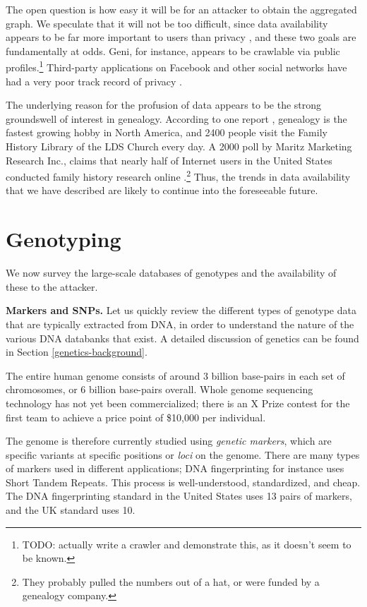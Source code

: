 \documentclass{article}
\begin{document}
The open question is how easy it will be for an attacker to obtain the aggregated graph. We speculate that it will not be too difficult, since data availability appears to be far more important to users than privacy \cite{wp-geni.com}, and these two goals are fundamentally at odds. Geni, for instance, appears to be crawlable via public profiles.\footnote{TODO: actually write a crawler and demonstrate this, as it doesn't seem to be known.}  Third-party applications on Facebook and other social networks have had a very poor track record of privacy \cite{felt-evans}.

The underlying reason for the profusion of data appears to be the strong groundswell of interest in genealogy. According to one report \cite{hobby}, genealogy is the fastest growing hobby in North America, and 2400 people visit the Family History Library of the LDS Church every day. A 2000 poll by Maritz Marketing Research Inc., claims that nearly half of Internet users in the United States conducted family history research online \cite{maritz-poll}.\footnote{They probably pulled the numbers out of a hat, or were funded by a genealogy company.} Thus, the trends in data availability that we have described are likely to continue into the foreseeable future.


\section{Genotyping}
\label{genotype-survey}
We now survey the large-scale databases of genotypes and the availability of these to the attacker. 

{\bf Markers and SNPs.} 
Let us quickly review the different types of genotype data that are typically extracted from DNA, in order to understand the nature of the various DNA databanks that exist. A detailed discussion of genetics can be found in Section \ref{genetics-background}.

The entire human genome consists of around 3 billion base-pairs in each set of chromosomes, or 6 billion base-pairs overall. Whole genome sequencing technology has not yet been commercialized; there is an X Prize contest for the first team to achieve a price point of \$10,000 per individual.

The genome is therefore currently studied using {\em genetic markers}, which are specific variants at specific positions or {\em loci} on the genome.  There are many types of markers used in different applications; DNA fingerprinting for instance uses Short Tandem Repeats. This process is well-understood, standardized, and cheap. The DNA fingerprinting standard in the United States uses 13 pairs of markers, and the UK standard uses 10.
\end{document}
